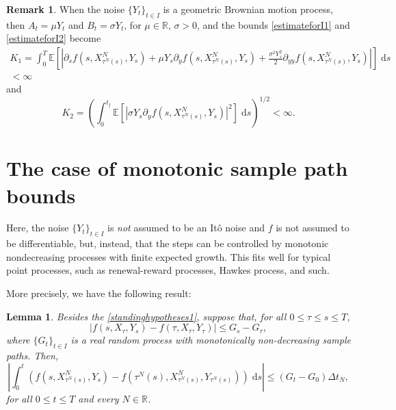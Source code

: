 \documentclass[reqno,12pt]{amsart}
\theoremstyle{plain}%
\newtheorem{lem}{Lemma}[section]
\theoremstyle{definition}
\newtheorem{rmk}{Remark}[section]
\begin{document}
\begin{rmk}
    When the noise $\{Y_t\}_{t\in I}$ is a geometric Brownian motion process, then $A_t = \mu  Y_t$ and $B_t = \sigma Y_t$, for $\mu\in \mathbb{R}$, $\sigma > 0$, and the bounds \eqref{estimateforI1} and \eqref{estimateforI2} become
    \begin{multline}
        K_1 = \int_0^{T}
        \mathbb{E}\left[\left|\partial_s f(s, X_{\tau^N(s)}^N, Y_s) + \mu Y_s \partial_y f(s, X_{\tau^N(s)}^N, Y_s) + \frac{\sigma^2 Y_s^2}{2}\partial_{yy}f(s, X_{\tau^N(s)}^N, Y_s) \right|\right] \;\mathrm{d}s \\
        < \infty
    \end{multline}
    and
    \begin{equation}
        K_2 = \left(\int_0^{t_j} \mathbb{E}\left[\left|\sigma Y_s \partial_y f(s, X_{\tau^N(s)}^N, Y_s)\right|^2\right] \;\mathrm{d}s\right)^{1/2} < \infty.
    \end{equation}
\end{rmk}

\section{The case of monotonic sample path bounds}
\label{secmonotonicbound}

Here, the noise $\{Y_t\}_{t\in I}$ is \emph{not} assumed to be an It\^o noise and $f$ is not assumed to be differentiable, but, instead, that the steps can be controlled by monotonic nondecreasing processes with finite expected growth. This fits well for typical point processes, such as renewal-reward processes, Hawkes process, and such.

More precisely, we have the following result:
\begin{lem}
    \label{lemmonotonicbound}
    Besides the \cref{standinghypotheses1}, suppose that, for all $0 \leq \tau \leq s \leq T$,
    \begin{equation}
      \label{monotonicbound}
        |f(s, X_\tau, Y_s) - f(\tau, X_\tau, Y_\tau)| \leq G_s - G_\tau,
    \end{equation}
    where $\{G_t\}_{t\in I}$ is a real random process with monotonically non-decreasing sample paths. Then,
    \begin{equation}
      \label{intfboundbyG}
        \left|\int_0^t \left( f(s, X_{\tau^N(s)}^N, Y_s) - f(\tau^N(s), X_{\tau^N(s)}^N, Y_{\tau^N(s)}) \right)\;\mathrm{d}s\right| \leq (G_t - G_0)\Delta t_N,
    \end{equation}
    for all $0 \leq t \leq T$ and every $N\in \mathbb{R}$.
\end{lem}
\end{document}
